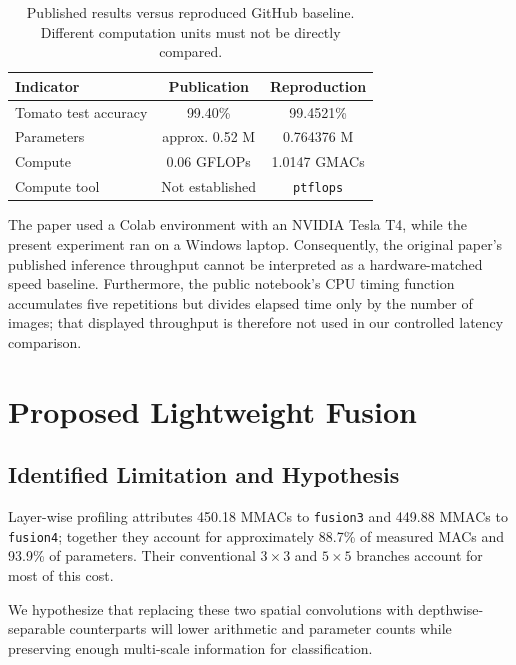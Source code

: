 \documentclass[conference,10pt]{IEEEtran}
\begin{document}
\begin{table}[t]
\centering
\caption{Published results versus reproduced GitHub baseline. Different computation units must not be directly compared.}
\label{tab:reprogap}
\setlength{\tabcolsep}{3.2pt}
\begin{tabular}{lcc}
\toprule
Indicator & Publication & Reproduction\\
\midrule
Tomato test accuracy & 99.40\% & 99.4521\%\\
Parameters & approx. 0.52 M & 0.764376 M\\
Compute & 0.06 GFLOPs & 1.0147 GMACs\\
Compute tool & Not established & \texttt{ptflops}\\
\bottomrule
\end{tabular}
\end{table}

The paper used a Colab environment with an NVIDIA Tesla T4, while the present experiment ran on a Windows laptop. Consequently, the original paper's published inference throughput cannot be interpreted as a hardware-matched speed baseline. Furthermore, the public notebook's CPU timing function accumulates five repetitions but divides elapsed time only by the number of images; that displayed throughput is therefore not used in our controlled latency comparison.

\section{Proposed Lightweight Fusion}
\subsection{Identified Limitation and Hypothesis}
Layer-wise profiling attributes 450.18 MMACs to \texttt{fusion3} and 449.88 MMACs to \texttt{fusion4}; together they account for approximately 88.7\% of measured MACs and 93.9\% of parameters. Their conventional $3\times3$ and $5\times5$ branches account for most of this cost.

We hypothesize that replacing these two spatial convolutions with depthwise-separable counterparts will lower arithmetic and parameter counts while preserving enough multi-scale information for classification.
\end{document}
